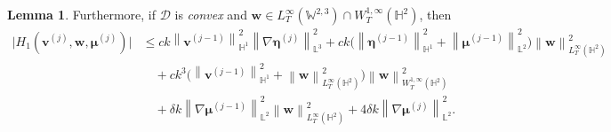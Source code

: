 \documentclass[11pt,reqno]{amsart}
\theoremstyle{definition}
\newtheorem{lemma}[theorem]{Lemma}
\numberwithin{equation}{section}
\newcommand{\bff}{\boldsymbol}
\newcommand{\bb}{\mathbb}
\newcommand{\nn}{\nonumber}
\newcommand{\norm}[2]{\left\|{#1}\right\|_{#2}}
\begin{document}
\begin{lemma}
    Furthermore, if $\mathscr{D}$ is \emph{convex} and $\bff{w}\in L^\infty_T(\bb{W}^{2,3})\cap W^{1,\infty}_T(\bb{H}^2)$, then
    \begin{align}\label{equ:H1 new}
	\big| H_1(\bff{v}^{(j)},\bff{w},\bff{\mu}^{(j)}) \big|
	&\le
	ck\norm{\bff{v}^{(j-1)}}{\bb{H}^1}^2
	\norm{\nabla\bff{\eta}^{(j)}}{\bb{L}^3}^2
	+
	ck
	\Big(\norm{\bff{\eta}^{(j-1)}}{\bb{H}^1}^2
	+ \norm{\bff{\mu}^{(j-1)}}{\bb{L}^2}^2 \Big)
	\norm{\bff{w}}{L^\infty_T(\bb{H}^2)}^2
	\nn\\
	&\quad
	+
	c k^3
	\Big(
	\norm{\bff{v}^{(j-1)}}{\bb{H}^1}^2
	+
	\norm{\bff{w}}{L^\infty_T(\bb{H}^2)}^2
	\Big)  	\norm{\bff{w}}{W^{1,\infty}_T(\bb{H}^2)}^2
	\nn\\
	&\quad
	+ \delta k \norm{\nabla\bff{\mu}^{(j-1)}}{\bb{L}^2}^2 \norm{\bff{w}}{L^\infty_T(\bb{H}^2)}^2
	+ 4 \delta k \norm{\nabla\bff{\mu}^{(j)}}{\bb{L}^2}^2.
    \end{align}
\end{lemma}
\end{document}
